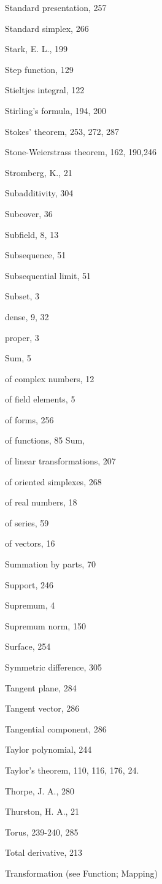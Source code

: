 \documentclass[10pt]{article}
\begin{document}
Standard presentation, 257

Standard simplex, 266

Stark, E. L., 199

Step function, 129

Stieltjes integral, 122

Stirling's formula, 194, 200

Stokes' theorem, 253, 272, 287

Stone-Weierstrass theorem, 162, 190,246

Stromberg, K., 21

Subadditivity, 304

Subcover, 36

Subfield, 8, 13

Subsequence, 51

Subsequential limit, 51

Subset, 3

dense, 9, 32

proper, 3

Sum, 5

of complex numbers, 12

of field elements, 5

of forms, 256

of functions, 85
Sum,

of linear transformations, 207

of oriented simplexes, 268

of real numbers, 18

of series, 59

of vectors, 16

Summation by parts, 70

Support, 246

Supremum, 4

Supremum norm, 150

Surface, 254

Symmetric difference, 305

Tangent plane, 284

Tangent vector, 286

Tangential component, 286

Taylor polynomial, 244

Taylor's theorem, 110, 116, 176, 24.

Thorpe, J. A., 280

Thurston, H. A., 21

Torus, 239-240, 285

Total derivative, 213

Transformation (see Function; Mapping)
\end{document}
